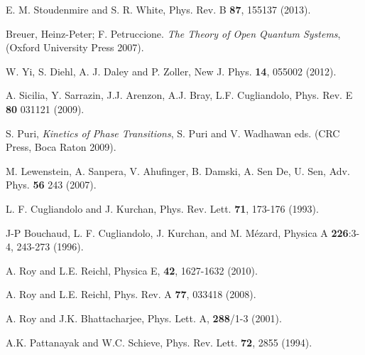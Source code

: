 \documentclass[a4paper,11pt,color]{article}
\renewenvironment{thebibliography}[1]{%
    \begin{oldthebibliography}{#1}%
      \setlength{\parskip}{0ex}%
      \setlength{\itemsep}{0ex}%
  }%
  {%
    \end{oldthebibliography}%
  }
\begin{document}
\begin{thebibliography}{}
E. M. Stoudenmire and S. R. White, Phys. Rev. B {\bf 87}, 155137 (2013).

Breuer, Heinz-Peter; F. Petruccione. \textit{The Theory of Open Quantum Systems}, (Oxford University Press 2007).

W. Yi, S. Diehl, A. J. Daley and P. Zoller, New J. Phys. {\bf 14}, 055002 (2012).

A. Sicilia, Y. Sarrazin, J.J. Arenzon, A.J. Bray, L.F. Cugliandolo, Phys. Rev. E {\bf 80} 031121 (2009).

S. Puri, \textit{Kinetics of Phase Transitions}, S. Puri and V. Wadhawan eds. (CRC Press, Boca Raton 2009).

M. Lewenstein, A. Sanpera, V. Ahufinger, B. Damski, A. Sen De, U. Sen, Adv. Phys. {\bf 56}
243 (2007).

L. F. Cugliandolo and J. Kurchan,  Phys. Rev. Lett. {\bf 71}, 173-176 (1993).

J-P Bouchaud, L. F. Cugliandolo, J. Kurchan, and M. M\'ezard, Physica A {\bf 226}:3-4, 243-273 (1996).





A. Roy and L.E. Reichl,  Physica {E}, {\bf 42}, 1627-1632 (2010). 

A. Roy and L.E. Reichl,  Phys. Rev. {A} {\bf 77}, 033418 (2008).

A. Roy and J.K. Bhattacharjee, Phys. Lett. {A}, {\bf 288}/1-3 (2001).

A.K. Pattanayak and W.C. Schieve, Phys. Rev. Lett. {\bf 72}, 2855 (1994).


\end{thebibliography}
\end{document}
